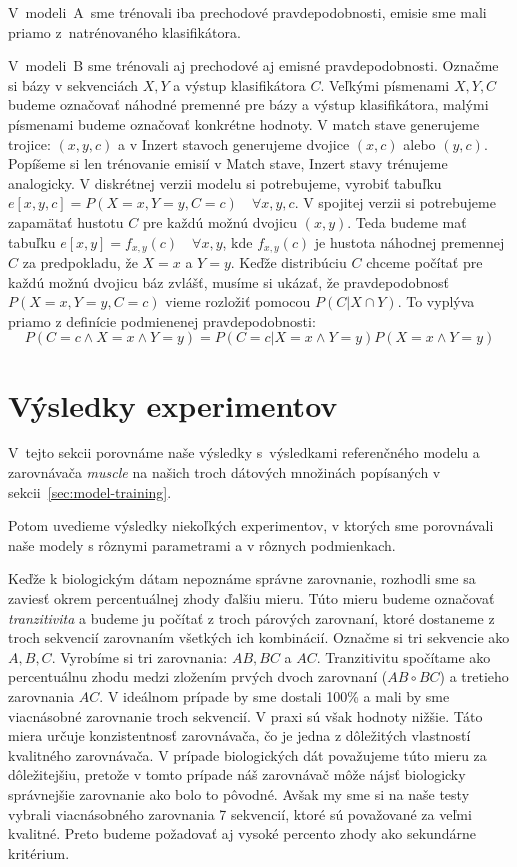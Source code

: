 V~modeli~A~sme trénovali iba prechodové pravdepodobnosti, emisie sme mali priamo z~natrénovaného klasifikátora.

V~modeli~B sme trénovali aj prechodové aj emisné pravdepodobnosti.
Označme si bázy v sekvenciách $X, Y$ a výstup klasifikátora $C$. Veľkými písmenami $X, Y, C$ budeme označovať náhodné premenné pre bázy a výstup klasifikátora, malými písmenami budeme označovať konkrétne hodnoty. V match stave generujeme trojice: $(x, y, c)$ a v Inzert stavoch generujeme dvojice $(x, c)$ alebo $(y, c)$. Popíšeme si len trénovanie emisií v Match stave, Inzert stavy trénujeme analogicky. V diskrétnej verzii modelu si potrebujeme, vyrobiť tabuľku $e[x, y, c] = P(X=x, Y=y, C=c)\quad \forall x, y, c$. V spojitej verzii si potrebujeme zapamätať hustotu $C$ pre každú možnú dvojicu $(x, y)$. Teda budeme mať tabuľku $e[x, y] = f_{x,y}(c)\quad \forall x, y$, kde $f_{x,y}(c)$ je hustota náhodnej premennej $C$ za predpokladu, že $X=x$ a $Y=y$.
Keďže distribúciu $C$ chceme počítať pre každú možnú dvojicu báz zvlášť, musíme si ukázať, že pravdepodobnosť $P(X=x, Y=y, C=c)$ vieme rozložiť pomocou $P(C|X \cap Y)$. To vyplýva priamo z definície podmienenej pravdepodobnosti:
$$P\left(C=c \wedge X=x \wedge Y=y\right) = P\left(C=c | X=x \wedge Y=y\right) P\left(X=x \wedge Y=y\right)$$

\section{Výsledky experimentov}
V~tejto sekcii porovnáme naše výsledky s~výsledkami referenčného modelu a zarovnávača \textit{muscle} \cite{edgar2004muscle} na našich troch dátových množinách popísaných v sekcii~\ref{sec:model-training}.

Potom uvedieme výsledky niekoľkých experimentov, v ktorých sme porovnávali naše modely s rôznymi parametrami a v rôznych podmienkach.

Keďže k biologickým dátam nepoznáme správne zarovnanie, rozhodli sme sa zaviesť okrem percentuálnej zhody ďalšiu mieru. Túto mieru budeme označovať \textit{tranzitivita} a budeme ju počítať z troch párových zarovnaní, ktoré dostaneme z troch sekvencií zarovnaním všetkých ich kombinácií. Označme si tri  sekvencie ako $A, B, C$. Vyrobíme si tri zarovnania: $AB, BC$ a $AC$. Tranzitivitu spočítame ako percentuálnu zhodu medzi zložením prvých dvoch zarovnaní ($AB \circ BC$) a tretieho zarovnania $AC$. V ideálnom prípade by sme dostali 100\% a mali by sme viacnásobné zarovnanie troch sekvencií. V praxi sú však hodnoty nižšie.
Táto miera určuje konzistentnosť zarovnávača, čo je jedna z dôležitých vlastností kvalitného zarovnávača. V prípade biologických dát považujeme túto mieru za dôležitejšiu, pretože v tomto prípade náš zarovnávač môže nájsť biologicky správnejšie zarovnanie ako bolo to pôvodné. Avšak my sme si na naše testy vybrali viacnásobného zarovnania 7 sekvencií, ktoré sú považované za veľmi kvalitné. Preto budeme požadovať aj vysoké percento zhody ako sekundárne kritérium.

